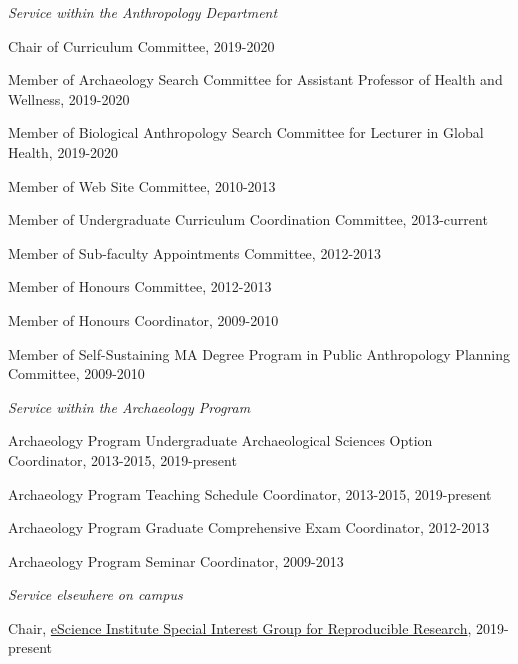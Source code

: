 
\medskip

\noindent\emph{Service within the Anthropology Department \vspace{0.01in}}

\medskip

\ind Chair of Curriculum Committee, 2019-2020 

\ind Member of Archaeology Search Committee for Assistant Professor of Health and Wellness,  2019-2020 

\ind Member of Biological Anthropology Search Committee for Lecturer in Global Health, 2019-2020 

\ind Member of Web Site Committee, 2010-2013

\ind Member of Undergraduate Curriculum Coordination Committee, 2013-current

\ind Member of Sub-faculty Appointments Committee, 2012-2013

\ind Member of Honours Committee, 2012-2013

\ind Member of Honours Coordinator, 2009-2010

\ind Member of Self-Sustaining MA Degree Program in Public Anthropology Planning Committee, 2009-2010

\medskip

\noindent\emph{Service within the Archaeology Program \vspace{0.01in}}

\medskip

\ind Archaeology Program Undergraduate Archaeological Sciences Option Coordinator, 2013-2015, 2019-present

\ind Archaeology Program Teaching Schedule Coordinator, 2013-2015, 2019-present

\ind Archaeology Program Graduate Comprehensive Exam Coordinator, 2012-2013

\ind Archaeology Program Seminar Coordinator, 2009-2013

 \medskip
 
 \newpage

\noindent\emph{Service elsewhere on campus\vspace{0.01in}}

\medskip

\ind Chair, \href{http://uwescience.github.io/reproducible/}{eScience Institute Special Interest Group for Reproducible Research}, 2019-present

